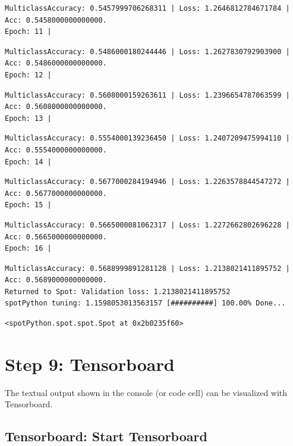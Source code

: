 \documentclass[
  letterpaper,
  DIV=11,
  numbers=noendperiod]{scrreprt}
\begin{document}
\begin{verbatim}
MulticlassAccuracy: 0.5457999706268311 | Loss: 1.2646812784671784 | Acc: 0.5458000000000000.
Epoch: 11 | 
\end{verbatim}

\begin{verbatim}
MulticlassAccuracy: 0.5486000180244446 | Loss: 1.2627830792903900 | Acc: 0.5486000000000000.
Epoch: 12 | 
\end{verbatim}

\begin{verbatim}
MulticlassAccuracy: 0.5608000159263611 | Loss: 1.2396654787063599 | Acc: 0.5608000000000000.
Epoch: 13 | 
\end{verbatim}

\begin{verbatim}
MulticlassAccuracy: 0.5554000139236450 | Loss: 1.2407209475994110 | Acc: 0.5554000000000000.
Epoch: 14 | 
\end{verbatim}

\begin{verbatim}
MulticlassAccuracy: 0.5677000284194946 | Loss: 1.2263578844547272 | Acc: 0.5677000000000000.
Epoch: 15 | 
\end{verbatim}

\begin{verbatim}
MulticlassAccuracy: 0.5665000081062317 | Loss: 1.2272662802696228 | Acc: 0.5665000000000000.
Epoch: 16 | 
\end{verbatim}

\begin{verbatim}
MulticlassAccuracy: 0.5688999891281128 | Loss: 1.2138021411895752 | Acc: 0.5689000000000000.
Returned to Spot: Validation loss: 1.2138021411895752
spotPython tuning: 1.1598053013563157 [##########] 100.00% Done...
\end{verbatim}

\begin{verbatim}
<spotPython.spot.spot.Spot at 0x2b0235f60>
\end{verbatim}

\hypertarget{sec-tensorboard-14}{%
\section{Step 9: Tensorboard}\label{sec-tensorboard-14}}

The textual output shown in the console (or code cell) can be visualized
with Tensorboard.

\hypertarget{tensorboard-start-tensorboard}{%
\subsection{Tensorboard: Start
Tensorboard}\label{tensorboard-start-tensorboard}}
\end{document}

